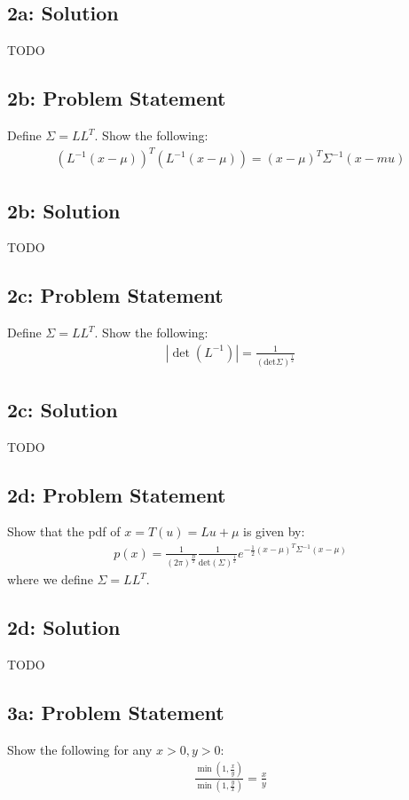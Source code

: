 \documentclass[10pt]{article}
\newcommand{\officialdirections}[1]{{\color{blue} #1}}
\begin{document}
\subsection{2a: Solution}
TODO




\newpage
\officialdirections{
\subsection*{2b: Problem Statement}
Define $\Sigma = L L^T$. Show the following:
\begin{align}
( L^{-1} (x - \mu))^T ( L^{-1} (x - \mu)) = (x-\mu)^T \Sigma^{-1} (x-mu)
\end{align}
}

\subsection{2b: Solution}
TODO


\newpage
\officialdirections{
\subsection*{2c: Problem Statement}
 Define $\Sigma = L L^T$. Show the following:
\begin{align}
| \det (L^{-1}) | = \frac{1}{(\text{det} \Sigma)^{\frac{1}{2}}}
\end{align}
}

\subsection{2c: Solution}
TODO


 \newpage
\officialdirections{
\subsection*{2d: Problem Statement}
Show that the pdf of $x = T(u) = L u + \mu$ is given by:
\begin{align}
p(x) = \frac{1}{(2\pi)^{\frac{D}{2}}} \frac{1}{\text{det}(\Sigma)^{\frac{1}{2}}} e^{-\frac{1}{2} (x-\mu)^T \Sigma^{-1} (x-\mu)}
\end{align}
where we define $\Sigma = L L^T$. 
}

\subsection{2d: Solution}
TODO

\newpage
\officialdirections{
\subsection*{3a: Problem Statement}
Show the following for any $x > 0, y > 0$:
\begin{align}
\frac
  { \min \left( 1, \frac{x}{y} \right) }
  { \min \left( 1, \frac{y}{x} \right) }
=
\frac{x}{y}
\end{align}
}
\end{document}
